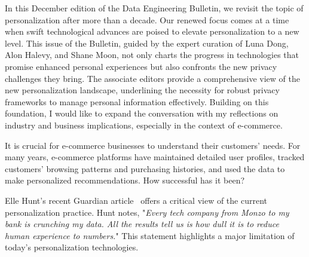 \documentclass[11pt]{article}
\begin{document}
In this December edition of the Data Engineering Bulletin, we revisit the topic of personalization after more than a decade. Our renewed focus comes at a time when swift technological advances are poised to elevate personalization to a new level. This issue of the Bulletin, guided by the expert curation of Luna Dong, Alon Halevy, and Shane Moon, not only charts the progress in technologies that promise enhanced personal experiences but also confronts the new privacy challenges they bring. The associate editors provide a comprehensive view of the new personalization landscape, underlining the necessity for robust privacy frameworks to manage personal information effectively. Building on this foundation, I would like to expand the conversation with my reflections on industry and business implications, especially in the context of e-commerce. 


It is crucial for e-commerce businesses to understand their customers' needs. For many years, e-commerce platforms have maintained detailed user profiles, tracked customers' browsing patterns and purchasing histories, and used the data to make personalized recommendations. How successful has it been?


Elle Hunt's recent Guardian article~\cite{guardian2023} offers a critical view of the current personalization practice. Hunt notes, "{\it Every tech company from Monzo to my bank is crunching my data. All the results tell us is how dull it is to reduce human experience to numbers.}" This statement highlights a major limitation of today’s personalization technologies.


\end{document}

